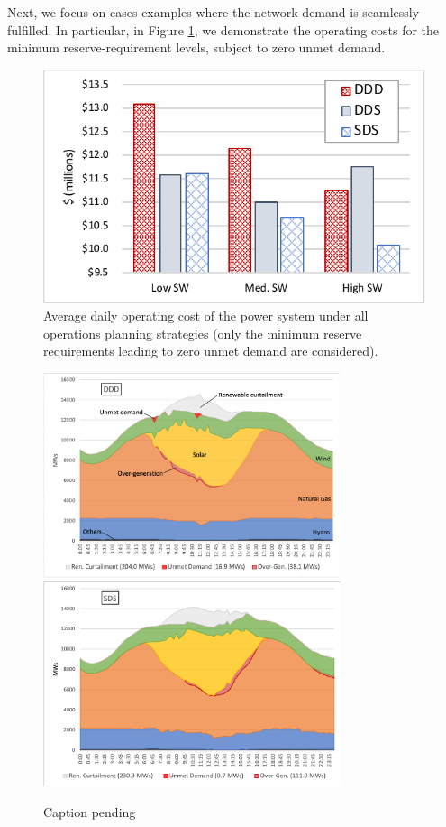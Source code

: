 Next, we focus on cases examples where the network demand is seamlessly fulfilled. In particular, in Figure \ref{sec:experiments:fig:avg_daily_cost_demand_met}, we demonstrate the operating costs for the minimum reserve-requirement levels, subject to zero unmet demand. 
\begin{figure}[h!]
\centering
\includegraphics[trim={5mm 2mm 2mm 2mm}, clip, scale=1]{./figures/cost_vs_RI.pdf}
\caption{Average daily operating cost of the power system under all operations planning strategies (only the minimum reserve requirements leading to zero unmet demand are considered).}
\label{sec:experiments:fig:avg_daily_cost_demand_met}
\end{figure} 

\begin{figure}[h!]
\centering
\includegraphics[trim={5mm 2mm 3mm 3mm}, clip, height=6cm]{./figures/ddd_gen_mix.png}
\includegraphics[trim={5mm 2mm 3mm 2mm}, clip, height=6cm]{./figures/sds_gen_mix.png}
\caption{Caption pending}
\label{sec:experiments:fig:generation_mix}
\end{figure} 


